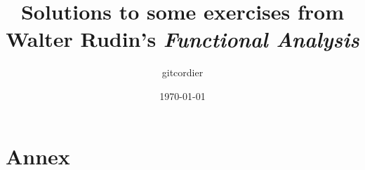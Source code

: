 \documentclass[a4paper,10pt,titlepage,openany,leqno]{book}
\theoremstyle{namedtheorem}
\newcommand{\ROOT}{.}
\newcommand{\TITLE}{Solutions to some exercises from Walter Rudin's \textit{Functional Analysis}}
\newcommand{\AUTHOR}{gitcordier}
\begin{document}
\renewcommand{\proofname}{{\normalfont \small PROOF}}
%    
\title{\TITLE}
\author{\AUTHOR}
\date{\today}
\maketitle
{\pagestyle{empty}\cleardoublepage}%

% 
\frontmatter
\tableofcontents

\renewcommand{\thesection}{\Roman{section}}
\renewcommand{\thesubsection}{\roman{subsection}}
\renewcommand{\thesubsubsection}{\roman{subsubsection}}


\renewcommand{\thesection}{\arabic{section}}
\renewcommand{\thesubsection}{\arabic{subsection}}
\renewcommand{\thesubsubsection}{\arabic{subsubsection}}
\mainmatter
 

\backmatter
\chapter{Annex}


\setcounter{annex_chapter}{1}
\setcounter{annex_section}{1}
\setcounter{equation}{0}

\renewcommand{\thechapter}{\Alph{annex_chapter}} 
\renewcommand{\thesection}{\thechapter.\arabic{annex_section}} 
\renewcommand{\theequation}{\thechapter.\arabic{equation}}
\renewcommand{\theHequation}{\thechapter.\arabic{equation}}
\renewcommand{\theHtheorem}{\thechapter.\arabic{theorem}}
% 



\cleardoublepage

\end{document}
